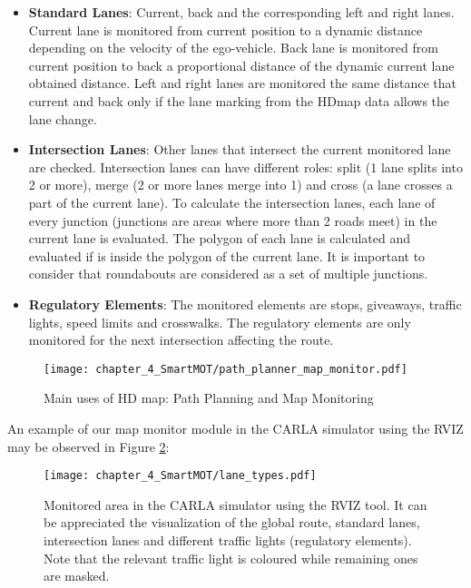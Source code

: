 \begin{itemize}
	
	\item \textbf{Standard Lanes}: Current, back and the corresponding left and right lanes. Current lane is monitored from current position to a dynamic distance depending on the velocity of the ego-vehicle. Back lane is monitored from current position to back a proportional distance of the dynamic current lane obtained distance. Left and right lanes are monitored the same distance that current and back only if the lane marking from the \ac{HDmap} data allows the lane change.
	
	\item \textbf{Intersection Lanes}: Other lanes that intersect the current monitored lane are checked. Intersection lanes can have different roles: split (1 lane splits into 2 or more), merge (2 or more lanes merge into 1) and cross (a lane crosses a part of the current lane). To calculate the intersection lanes, each lane of every junction (junctions are areas where more than 2 roads meet) in the current lane is evaluated. The polygon of each lane is calculated and evaluated if is inside the polygon of the current lane. It is important to consider that roundabouts are considered as a set of multiple junctions. 
	
	\item \textbf{Regulatory Elements}: The monitored elements are stops, giveaways, traffic lights, speed limits and crosswalks. The regulatory elements are only monitored for the next intersection affecting the route. 
	
\end{itemize}

\begin{figure}[] 
	\centering
	\texttt{[image: chapter\_4\_SmartMOT/path\_planner\_map\_monitor.pdf]}
	\caption{Main uses of HD map: Path Planning and Map Monitoring}
	\label{fig:chapter_4_SmartMOT/path_planner_map_monitor}
\end{figure}

An example of our map monitor module in the CARLA simulator \cite{dosovitskiy2017carla} using the \ac{RVIZ} \cite{quigley2009ros} may be observed in Figure \ref{fig:chapter_4_SmartMOT/monitored_area_CARLA_ROS}:

\begin{figure}[h] 
	\centering
	\texttt{[image: chapter\_4\_SmartMOT/lane\_types.pdf]}
	\captionsetup{justification=justified}
	\caption[Monitored area in the CARLA simulator using the \ac{RVIZ} tool]{Monitored area in the CARLA simulator using the \ac{RVIZ} tool. It can be appreciated the visualization of the global route, standard lanes, intersection lanes and different traffic lights (regulatory elements). Note that the relevant traffic light is coloured while remaining ones are masked.}
	\label{fig:chapter_4_SmartMOT/monitored_area_CARLA_ROS}
\end{figure}

